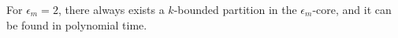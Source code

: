 \documentclass[sigconf]{aamas}
\begin{document}



\begin{theorem}
For $\epsilon_m = 2$, there always exists a $k$-bounded partition in the $\epsilon_m$-core, and it can be found in polynomial time.
\end{theorem}

\end{document}
